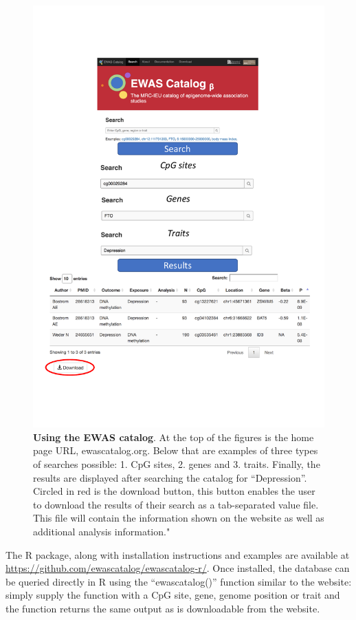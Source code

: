 \documentclass[11pt,oneside]{bristolthesis}
\begin{document}
\begin{figure}

{\centering \includegraphics[width=1\linewidth]{figure/03-ewas_catalog/using_the_catalog} 

}

\caption[Using the EWAS catalog]{\textbf{Using the EWAS catalog}. At the top of the figures is the home page URL, ewascatalog.org. Below that are examples of three types of searches possible: 1. CpG sites, 2. genes and 3. traits. Finally, the results are displayed after searching the catalog for ``Depression''. Circled in red is the download button, this button enables the user to download the results of their search as a tab-separated value file. This file will contain the information shown on the website as well as additional analysis information."}\label{fig:catalog-use}
\end{figure}
The R package, along with installation instructions and examples are available at \url{https://github.com/ewascatalog/ewascatalog-r/}. Once installed, the database can be queried directly in R using the ``ewascatalog()'' function similar to the website: simply supply the function with a CpG site, gene, genome position or trait and the function returns the same output as is downloadable from the website.
\end{document}

